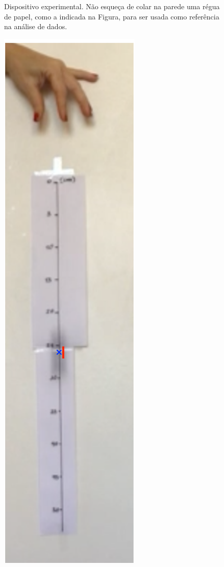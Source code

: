 \begin{minipage}{\linewidth}
\begin{minipage}{0.25\linewidth}
\begin{figure}[H]
              \caption{\label{fig:experimento} Dispositivo experimental. Não esqueça de colar na parede uma régua de papel, como a indicada na Figura, para ser usada como referência na análise de dados.}
          \end{figure}
      \end{minipage}
      \hspace{0.05\linewidth}
      \begin{minipage}{0.3\linewidth}
          \begin{figure}[H]
              \includegraphics[width=\linewidth]{Figuras_exp3/fig2roteiro.pdf}

\end{figure}
\end{minipage}
\end{minipage}
